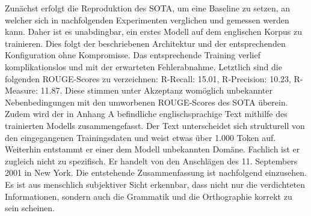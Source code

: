 \noindent
Zunächst erfolgt die Reproduktion des \ac{SOTA}, um eine Baseline zu setzen, an welcher sich in nachfolgenden Experimenten verglichen und gemessen werden kann. Daher ist es unabdingbar, ein erstes Modell auf dem englischen Korpus zu trainieren. Dies folgt der beschriebenen Architektur und der entsprechenden Konfiguration ohne Kompromisse. Das entsprechende Training verlief komplikationslos und mit der erwarteten Fehlerabnahme. Letztlich sind die folgenden \ac{ROUGE}-Scores zu verzeichnen: R-Recall: 15.01, R-Precision: 10.23, R-Measure: 11.87. Diese stimmen unter Akzeptanz womöglich unbekannter Nebenbedingungen mit den umworbenen \ac{ROUGE}-Scores des \ac{SOTA} überein.\\

\noindent
Zudem wird der in Anhang A befindliche englischsprachige Text mithilfe des trainierten Modells zusammengefasst. Der Text unterscheidet sich strukturell von den eingegangenen Trainingsdaten und weist etwas über 1.000 Token auf. Weiterhin entstammt er einer dem Modell unbekannten Domäne. Fachlich ist er zugleich nicht zu spezifisch. Er handelt von den Anschlägen des 11. Septembers 2001 in New York. Die entstehende Zusammenfassung ist nachfolgend einzusehen. Es ist aus menschlich subjektiver Sicht erkennbar, dass nicht nur die verdichteten Informationen, sondern auch die Grammatik und die Orthographie korrekt zu sein scheinen.\\

\noindent{}\\
